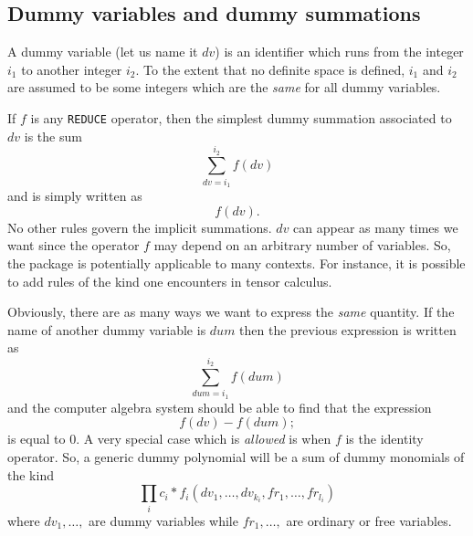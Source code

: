 \subsection{Dummy variables and dummy summations}
A dummy variable (let us name it $dv$) is an identifier which runs from 
the integer $i_1$ to another integer $i_2$. To the extent that no 
definite space is defined, $i_1$ and $i_2$ are assumed to be some 
integers which are the {\em same} for all dummy variables.

If $f$ is any {\tt REDUCE} operator, then the simplest dummy summation 
associated to $dv$ is the sum
\[
\sum_{dv=i_1}^{i_2} f(dv)
\]
and is simply written as
\[
f(dv). 
\]
No other rules govern the implicit summations. $dv$ can appear as many times
we want since the operator $f$ may depend on an arbitrary number of 
variables. So, the package is potentially applicable to many contexts.
For instance, it is possible to add rules of the kind one encounters in 
tensor calculus.      

Obviously, there are as many ways we want to express the {\em same} quantity.
If the name of another dummy variable is $dum$ then 
the previous expression is written as
\[
\sum_{dum=i_1}^{i_2} f(dum)
\]
and the computer algebra system should be able to find that the expression
\[
f(dv)-f(dum);
\]
is equal to $0$.
A very special case which is {\em allowed} is when $f$ is the identity 
operator.
So, a generic dummy polynomial will be a sum 
of dummy monomials of the  kind
\[
\prod_i c_i*f_i(dv_1,\ldots ,dv_{k_i},fr_1,\ldots , fr_{l_i})
\]
where $dv_1,\ldots,$ are dummy variables while $fr_1, \ldots, $ 
are ordinary or free variables. 


